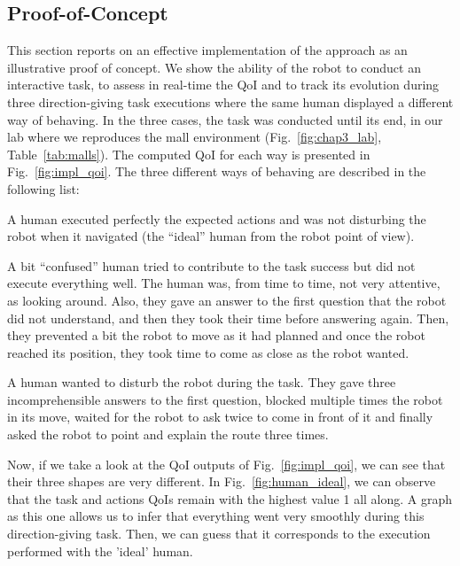 \documentclass[a4paper,11pt,twoside]{StyleThese}
\begin{document}
\subsection{Proof-of-Concept}\label{subsec:results}
This section reports on an effective implementation of the approach as an illustrative proof of concept. We show the ability of the robot to conduct an interactive task, to assess in real-time the QoI and to track its evolution during three direction-giving task executions where the same human displayed a different way of behaving. In the three cases, the task was conducted until its end, in our lab where we reproduces the mall environment (Fig.~\ref{fig:chap3_lab}, Table~\ref{tab:malls}). The computed QoI for each way is presented in Fig.~\ref{fig:impl_qoi}. The three different ways of behaving are described in the following list:
\begin{bulletList}
	\item A human executed perfectly the expected actions and was not disturbing the robot when it navigated (\ie the ``ideal'' human from the robot point of view). 
	\item A bit ``confused'' human tried to contribute to the task success but did not execute everything well. The human was, from time to time, not very attentive, as looking around. Also, they gave an answer to the first question that the robot did not understand, and then they took their time before answering again. Then, they prevented a bit the robot to move as it had planned and once the robot reached its position, they took time to come as close as the robot wanted. 
	\item A human wanted to disturb the robot during the task. They gave three incomprehensible answers to the first question, blocked multiple times the robot in its move, waited for the robot to ask twice to come in front of it and finally asked the robot to point and explain the route three times. 
\end{bulletList}

Now, if we take a look at the QoI outputs of Fig.~\ref{fig:impl_qoi}, we can see that their three shapes are very different. In Fig.~\ref{fig:human_ideal}, we can observe that the task and actions QoIs remain with the highest value 1 all along. A graph as this one allows us to infer that everything went very smoothly during this direction-giving task. Then, we can guess that it corresponds to the execution performed with the 'ideal' human. 
\end{document}
